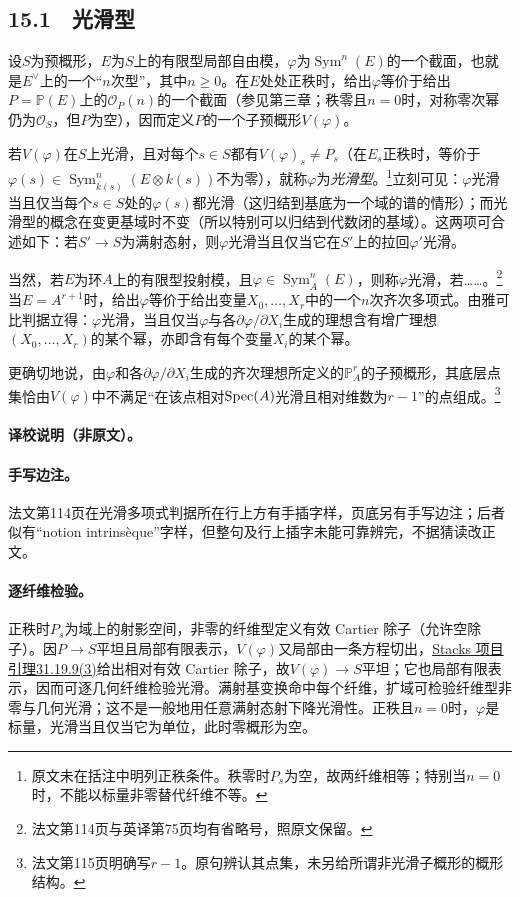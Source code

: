 \subsection*{15.1　光滑型}
\begingroup
\def\OO{\mathcal O}\def\m{\mathfrak m}\def\mm{\mathfrak m}\def\Sym{\operatorname{Sym}}
设$S$为预概形，$E$为$S$上的有限型局部自由模，$\varphi$为$\Sym^n(E)$的一个截面，也就是$E^\vee$上的一个“$n$次型”，其中$n\ge0$。在$E$处处正秩时，给出$\varphi$等价于给出$P=\mathbb P(E)$上的$\OO_P(n)$的一个截面（参见第三章；秩零且$n=0$时，对称零次幂仍为$\OO_S$，但$P$为空），因而定义$P$的一个子预概形$V(\varphi)$。

若$V(\varphi)$在$S$上光滑，且对每个$s\in S$都有$V(\varphi)_s\ne P_s$（在$E_s$正秩时，等价于$\varphi(s)\in\Sym_{k(s)}^n(E\otimes k(s))$不为零），就称$\varphi$为\emph{光滑型}。\footnote{原文未在括注中明列正秩条件。秩零时$P_s$为空，故两纤维相等；特别当$n=0$时，不能以标量非零替代纤维不等。}立刻可见：$\varphi$光滑当且仅当每个$s\in S$处的$\varphi(s)$都光滑（这归结到基底为一个域的谱的情形）；而光滑型的概念在变更基域时不变（所以特别可以归结到代数闭的基域）。这两项可合述如下：若$S'\to S$为满射态射，则$\varphi$光滑当且仅当它在$S'$上的拉回$\varphi'$光滑。

当然，若$E$为环$A$上的有限型投射模，且$\varphi\in\Sym_A^n(E)$，则称$\varphi$光滑，若……。\footnote{法文第114页与英译第75页均有省略号，照原文保留。}当$E=A^{r+1}$时，给出$\varphi$等价于给出变量$X_0,\ldots,X_r$中的一个$n$次齐次多项式。由雅可比判据立得：$\varphi$光滑，当且仅当$\varphi$与各$\partial\varphi/\partial X_i$生成的理想含有增广理想$(X_0,\ldots,X_r)$的某个幂，亦即含有每个变量$X_i$的某个幂。

更确切地说，由$\varphi$和各$\partial\varphi/\partial X_i$生成的齐次理想所定义的$\mathbb P_A^r$的子预概形，其底层点集恰由$V(\varphi)$中不满足“在该点相对$\operatorname{Spec}(A)$光滑且相对维数为$r-1$”的点组成。\footnote{法文第115页明确写$r-1$。原句辨认其点集，未另给所谓非光滑子概形的概形结构。}
\paragraph{译校说明（非原文）。}
\paragraph{手写边注。}
法文第114页在光滑多项式判据所在行上方有手插字样，页底另有手写边注；后者似有“notion intrinsèque”字样，但整句及行上插字未能可靠辨完，不据猜读改正文。

\paragraph{逐纤维检验。}
正秩时$P_s$为域上的射影空间，非零的纤维型定义有效 Cartier 除子（允许空除子）。因$P\to S$平坦且局部有限表示，$V(\varphi)$又局部由一条方程切出，\href{https://stacks.math.columbia.edu/tag/062Y}{Stacks 项目引理31.19.9(3)}给出相对有效 Cartier 除子，故$V(\varphi)\to S$平坦；它也局部有限表示，因而可逐几何纤维检验光滑。满射基变换命中每个纤维，扩域可检验纤维型非零与几何光滑；这不是一般地用任意满射态射下降光滑性。正秩且$n=0$时，$\varphi$是标量，光滑当且仅当它为单位，此时零概形为空。

